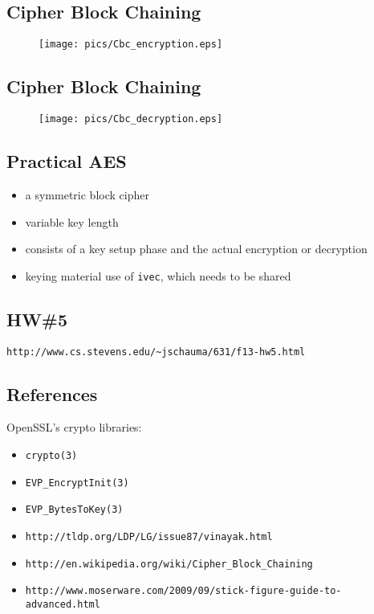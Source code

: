 \documentclass[xga]{xdvislides}
\begin{document}
\subsection{Cipher Block Chaining}
\begin{figure}[hb]
    \begin{center}
        \texttt{[image: pics/Cbc\_encryption.eps]} \\
    \end{center}
\end{figure}

\subsection{Cipher Block Chaining}
\begin{figure}[hb]
    \begin{center}
        \texttt{[image: pics/Cbc\_decryption.eps]} \\
    \end{center}
\end{figure}

\subsection{Practical AES}
\begin{itemize}
	\item a symmetric block cipher
	\item variable key length
	\item consists of a key setup phase and the actual encryption or
		decryption
	\item keying material use of {\tt ivec}, which needs to be shared
\end{itemize}


\subsection{HW\#5}
\verb+http://www.cs.stevens.edu/~jschauma/631/f13-hw5.html+ \\
\vspace{.5in}

\subsection{References}
OpenSSL's crypto libraries:
\begin{itemize}
	\item {\tt crypto(3)}
	\item {\tt EVP\_EncryptInit(3)}
	\item {\tt EVP\_BytesToKey(3)}
	\item {\tt http://tldp.org/LDP/LG/issue87/vinayak.html}
	\item {\tt http://en.wikipedia.org/wiki/Cipher\_Block\_Chaining}
	\item {\tt http://www.moserware.com/2009/09/stick-figure-guide-to-advanced.html}
\end{itemize}
\end{document}
